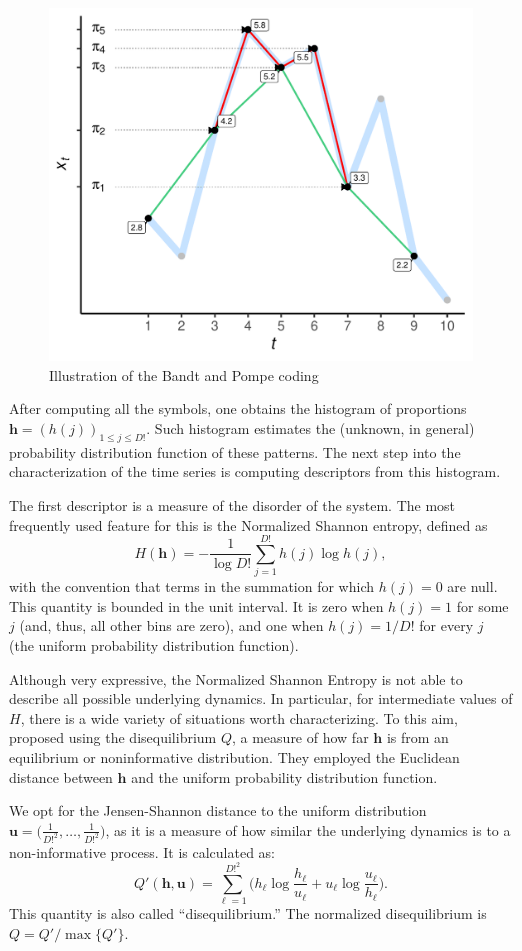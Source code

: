\documentclass[12pt]{article}
\begin{document}
\begin{figure}[hbt]
	\centering
	\includegraphics[width=.7\linewidth]{IntroBP}
	\caption{Illustration of the Bandt and Pompe coding}
	\label{Fig:IntroBP}
\end{figure}

After computing all the symbols, one obtains the histogram of proportions $\bm h = (h(j))_{1\leq j\leq D!}$.
Such histogram estimates the (unknown, in general) probability distribution function of these patterns.
The next step into the characterization of the time series is computing descriptors from this histogram.

The first descriptor is a measure of the disorder of the system.
The most frequently used feature for this is the Normalized Shannon entropy, defined as
\begin{equation}
	H(\bm h) = -\frac{1}{\log D!} \sum_{j=1}^{D!} h(j) \log h(j),
\end{equation}
with the convention that terms in the summation for which $h(j)=0$ are null.
This quantity is bounded in the unit interval. 
It is zero when $h(j)=1$ for some $j$ (and, thus, all other bins are zero), and one when $h(j)=1/D!$ for every $j$ (the uniform probability distribution function).

Although very expressive, the Normalized Shannon Entropy is not able to describe all possible underlying dynamics.
In particular, for intermediate values of $H$, there is a wide variety of situations worth characterizing.
To this aim, \citet{LopezRuiz1995} proposed using the disequilibrium  $Q$, a measure of how far $\bm h$ is from an equilibrium or noninformative distribution.
They employed the Euclidean distance between $\bm h$ and the uniform probability distribution function.

We opt for the Jensen-Shannon distance to the uniform distribution $\bm{u} = \big(\frac{1}{D!^2}, \dots, \frac{1}{D!^2}\big)$, as it is a measure of how similar the underlying dynamics is to a non-informative process.
It is calculated as:
\begin{equation}
	Q'(\bm{h}, \bm{u}) = \sum_{\ell=1}^{D!^2} \Big(h_\ell \log\frac{h_\ell}{u_\ell} +
	u_\ell \log\frac{u_\ell}{h_\ell}
	\Big).
\end{equation}
This quantity is also called ``disequilibrium.''
The normalized disequilibrium is $ Q=Q'/\max\{Q'\}$.
\end{document}
